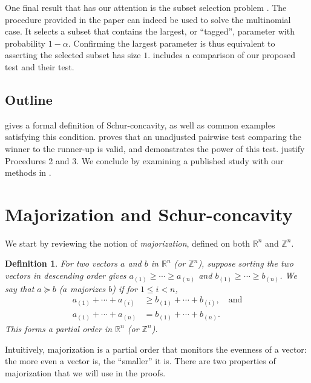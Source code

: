 \documentclass[11pt]{article}
\newtheorem{definition}{Definition}
\theoremstyle{definition}
\theoremstyle{custom}
\newcommand{\RR}{\mathbb{R}}
\newcommand{\ZZ}{\mathbb{Z}}
\newcommand{\WFcomment}[1]{{\color{red}{(WF: \bf \sc #1) }}}
\begin{document}
One final result that has our attention is the subset selection problem \citep{Gupta:1967wg}. The procedure provided in the paper can indeed be used to solve the multinomial case. It selects a subset that contains the largest, or ``tagged'', parameter with probability $1-\alpha$. Confirming the largest parameter is thus equivalent to asserting the selected subset has size $1$.  includes a comparison of our proposed test and their test.

\subsection{Outline}

\WFcomment{Rewrite for motivation}

 gives a formal definition of Schur-concavity, as well as common examples satisfying this condition.  proves that an unadjusted pairwise test comparing the winner to the runner-up is valid, and demonstrates the power of this test.  justify Procedures 2 and 3. We conclude by examining a published study with our methods in .

\section{Majorization and Schur-concavity}
\label{sec:maj}

We start by reviewing the notion of {\em majorization}, defined on both $\RR^n$ and $\ZZ^n$.

\begin{definition}
For two vectors $a$ and $b$ in $\RR^n$ (or $\ZZ^n$), suppose sorting the two vectors in descending order gives
$a_{\left(1\right)} \ge \cdots \ge a_{\left(n\right)}$ and $b_{\left(1\right)} \ge \cdots \ge b_{\left(n\right)}$. We say that $a \succeq b$ ($a$ majorizes $b$) if for $1 \le i < n$,
\begin{align*}
a_{\left(1\right)} + \cdots + a_{\left(i\right)} & \ge b_{\left(1\right)} + \cdots + b_{\left(i\right)}, \quad \text{and}\\
a_{\left(1\right)} + \cdots + a_{\left(n\right)} & = b_{\left(1\right)} + \cdots + b_{\left(n\right)}.
\end{align*}
This forms a partial order in $\RR^n$ (or $\ZZ^n$).
\end{definition}

Intuitively, majorization is a partial order that monitors the evenness of a vector: the more even a vector is, the ``smaller'' it is. There are two properties of majorization that we will use in the proofs.
\end{document}
